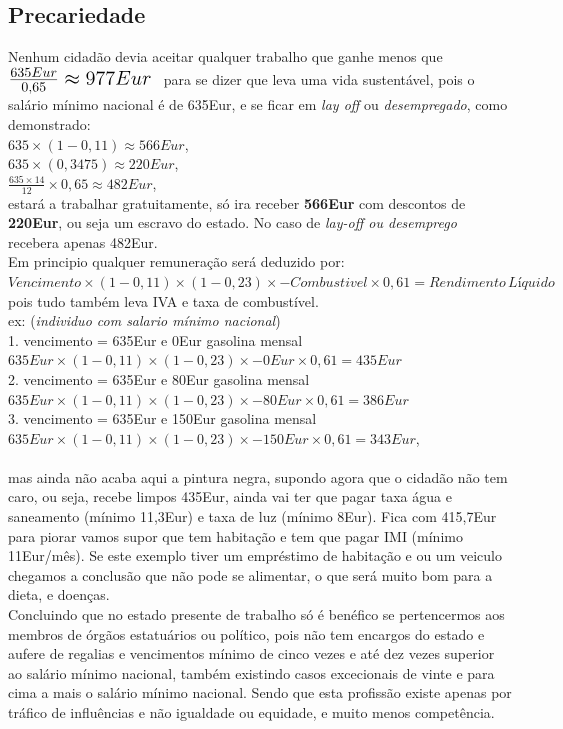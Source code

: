 \subsection{Precariedade}
Nenhum cidadão devia aceitar qualquer trabalho que ganhe menos que \; $ \mbox{\Large $ \frac{635Eur}{0,65}\approx 977Eur $ } $ para se dizer que leva uma vida sustentável, pois o salário mínimo nacional é de 635Eur, e se ficar em \textit{lay off} ou \textit{desempregado}, como demonstrado:\\
$635\times(1-0,11)\approx566Eur$,\\
$635\times(0,3475)\approx220Eur$,\\
$\frac{635\times14}{12}\times0,65 \approx 482Eur$, \\
estará a trabalhar gratuitamente, só ira receber \textbf{566Eur} com descontos de \textbf{220Eur}, ou seja um escravo do estado. No caso de \textit{lay-off ou desemprego} recebera apenas 482Eur.\\
Em principio qualquer remuneração será deduzido por: $Vencimento \times (1-0,11) \times (1-0,23) \times - Combustivel\times 0,61 = Rendimento \, Líquido$ pois tudo também leva IVA e taxa de combustível.\\
ex: (\textit{individuo com salario mínimo nacional})\\
1. vencimento = 635Eur e 0Eur gasolina mensal \\
\hspace*{1cm} $635Eur \times (1-0,11) \times (1-0,23) \times - 0Eur \times 0,61 = 435Eur$ \\
2. vencimento = 635Eur e 80Eur gasolina mensal \\
\hspace*{1cm} $635Eur \times (1-0,11) \times (1-0,23) \times - 80Eur \times 0,61 = 386Eur$ \\
3. vencimento = 635Eur e 150Eur gasolina mensal \\
\hspace*{1cm} $635Eur \times (1-0,11) \times (1-0,23) \times - 150Eur \times 0,61 = 343Eur$, \\ \\
mas ainda não acaba aqui a pintura negra, supondo agora que o cidadão não tem caro, ou seja, recebe limpos 435Eur, ainda vai ter que pagar taxa água e saneamento (mínimo 11,3Eur) e taxa de luz (mínimo 8Eur). Fica com 415,7Eur para piorar vamos supor que tem habitação e tem que pagar IMI (mínimo 11Eur/mês).
Se este exemplo tiver um empréstimo de habitação e ou um veiculo chegamos a conclusão que não pode se alimentar, o que será muito bom para a dieta, e doenças.\\
\newpage
Concluindo que no estado presente de trabalho só é benéfico se pertencermos aos membros de órgãos estatuários ou político, pois não tem encargos do estado e aufere de regalias e vencimentos mínimo de cinco vezes e até dez vezes superior ao salário mínimo nacional, também existindo casos excecionais de vinte e para cima a mais o salário mínimo nacional. Sendo que esta profissão existe apenas por tráfico de influências e não igualdade ou equidade, e muito menos competência.
